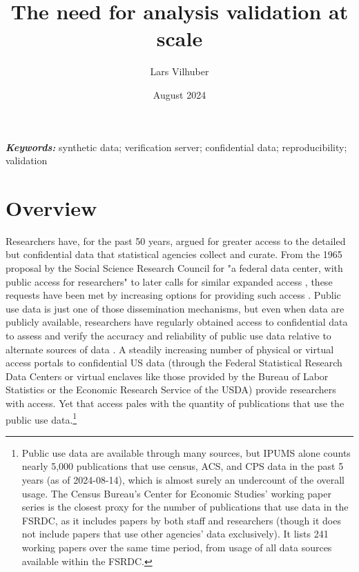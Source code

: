\documentclass{article}
\title{The need for analysis validation at scale}
\author{Lars Vilhuber}
\date{August 2024}
\begin{document}
\maketitle

%

\vspace*{0.15in}
\hspace{10pt}
  \small	
  \textbf{\textit{Keywords: }} {synthetic data; verification server; confidential data; reproducibility; validation}
  
\section{Overview}
\label{sec:overview}

Researchers have, for the past 50 years, argued for greater access to the detailed but confidential data that statistical agencies collect and curate. From the 1965 proposal by the Social Science Research
Council for "a federal data center, with public access for researchers" \citep[, pg. 219]{anderson_american_2015} to later calls for similar expanded access \citep[e.g.][]{card_expanding_2010}, these requests have been met by increasing options for providing such access \citep{united_nations_managing_2007,schouten_remote_2003,weinberg_access_2007,cole_handbook_2021}. Public use data is just one of those dissemination mechanisms, but even when data are publicly available, researchers have regularly obtained access to confidential data to assess and verify the accuracy and reliability of public use data relative to alternate sources of data \citep[to cite just a few, ][]{larrimore_consistent_2008,armour_using_2016,alexander_inaccurate_2010,abraham_exploring_2013,abraham_reconciling_2020}. A steadily increasing number of physical or virtual access portals to confidential US data (through the Federal Statistical Research Data Centers or virtual enclaves like those provided by the Bureau of Labor Statistics or the Economic Research Service of the USDA) provide researchers with access. Yet that access pales with the quantity of publications that use the public use data.\footnote{Public use data are available through many sources, but IPUMS alone counts nearly 5,000 publications that use census, ACS, and CPS data in the past 5 years (as of 2024-08-14), which is almost surely an undercount of the overall usage. The Census Bureau's Center for Economic Studies' working paper series is the closest proxy for the number of publications that use data in the FSRDC, as it includes papers by both staff and researchers (though it does not include papers that use other agencies' data exclusively). It lists 241 working papers over the same time period, from usage of all data sources available within the FSRDC.} 
\end{document}
